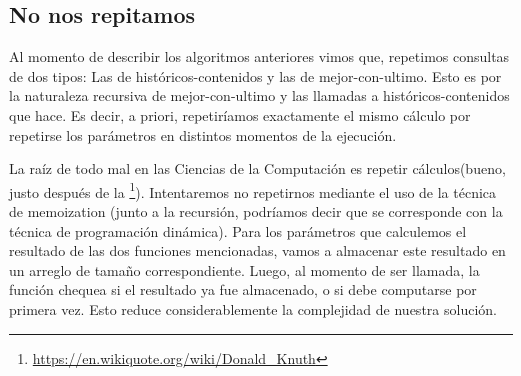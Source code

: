 \subsection{No nos repitamos}
\par{Al momento de describir los algoritmos anteriores vimos que, repetimos consultas de dos tipos:
Las de históricos-contenidos y las de mejor-con-ultimo. Esto es por la naturaleza recursiva de mejor-con-ultimo y las llamadas a históricos-contenidos que hace. Es decir, a priori, repetiríamos exactamente el mismo cálculo por repetirse los parámetros en distintos momentos de la ejecución.} \newline
\par{La raíz de todo mal en las Ciencias de la Computación es repetir cálculos(bueno, justo después de la \footnote{\url{https://en.wikiquote.org/wiki/Donald_Knuth}}). Intentaremos no repetirnos mediante el uso de la técnica de memoization (junto a la recursión, podríamos decir que se corresponde con la técnica de programación dinámica). Para los parámetros que calculemos el resultado de las dos funciones mencionadas, vamos a almacenar este resultado en un arreglo de tamaño correspondiente. Luego, al momento de ser llamada, la función chequea si el resultado ya fue almacenado, o si debe computarse por primera vez. Esto reduce considerablemente la complejidad de nuestra solución. } \newline
 

